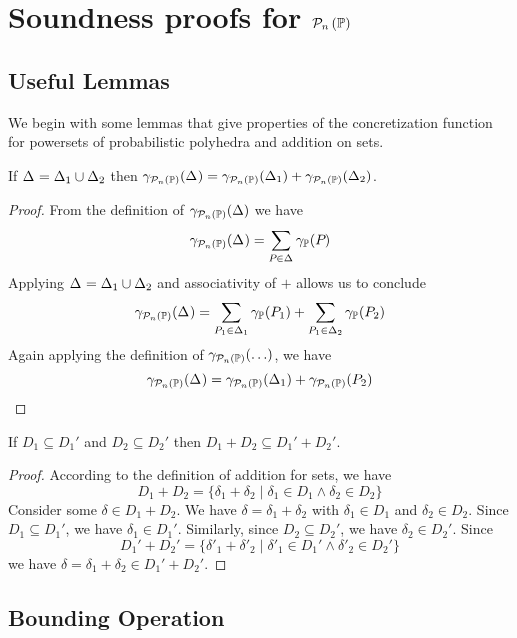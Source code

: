\vspace*{.1in}
\section{Soundness proofs for $ \mathcal{P}_{n}\left( \mathbb{P} \right) $} \label{appendix:proof2}

\subsection{Useful Lemmas}

We begin with some lemmas that give properties of the concretization function for powersets of probabilistic polyhedra and addition on sets.
\begin{lemma}
\label{lem:ppp-conc:partition}
If $\Delta_{} = \Delta_{1} \cup \Delta_{2}$ then
$\gamma_{\mathcal{P}_{n}\left( \mathbb{P} \right)}(\Delta_{}) = \gamma_{\mathcal{P}_{n}\left( \mathbb{P} \right)}(\Delta_{1}) + \gamma_{\mathcal{P}_{n}\left( \mathbb{P} \right)}(\Delta_{2})$.
\end{lemma}
\begin{proof}
From the definition of $\gamma_{\mathcal{P}_{n}\left( \mathbb{P} \right)}(\Delta)$ we have
\[\gamma_{\mathcal{P}_{n}\left( \mathbb{P} \right)}(\Delta_{}) = \sum_{P_{} \in \Delta_{}} \gamma_{\mathbb{P}}(P_{})\]
Applying $\Delta_{} = \Delta_{1} \cup \Delta_{2}$ and associativity of $+$ allows us to conclude
\[\gamma_{\mathcal{P}_{n}\left( \mathbb{P} \right)}(\Delta_{}) = \sum_{P_{1} \in \Delta_{1}} \gamma_{\mathbb{P}}(P_{1}) + \sum_{P_{1} \in \Delta_{2}} \gamma_{\mathbb{P}}(P_{2})\]
Again applying the definition of $\gamma_{\mathcal{P}_{n}\left( \mathbb{P} \right)}(\ldots)$, we have
\[\gamma_{\mathcal{P}_{n}\left( \mathbb{P} \right)}(\Delta_{}) = \gamma_{\mathcal{P}_{n}\left( \mathbb{P} \right)}(\Delta_{1}) + \gamma_{\mathcal{P}_{n}\left( \mathbb{P} \right)}(P_{2})\]
\end{proof}

\begin{lemma}
\label{lem:set-plus:subset}
If $D_1 \subseteq D_1'$ and $D_2 \subseteq D_2'$ then $D_1 + D_2 \subseteq D_1' + D_2'$.
\end{lemma}
\begin{proof}
According to the definition of addition for sets, we have
\[D_1 + D_2 = \{\delta_1 + \delta_2 \mid \delta_1 \in D_1 \wedge \delta_2 \in D_2\}\]
Consider some $\delta \in D_1 + D_2$.  We have $\delta = \delta_1 + \delta_2$ with
$\delta_1 \in D_1$ and $\delta_2 \in D_2$.  Since $D_1 \subseteq D_1'$, we have $\delta_1 \in D_1'$.
Similarly, since $D_2 \subseteq D_2'$, we have $\delta_2 \in D_2'$.
Since
\[D_1' + D_2' = \{\delta'_1 + \delta'_2 \mid \delta'_1 \in D_1' \wedge \delta'_2 \in D_2'\}\]
we have $\delta = \delta_1 + \delta_2 \in D_1' + D_2'$.
\end{proof}

\subsection{Bounding Operation}

